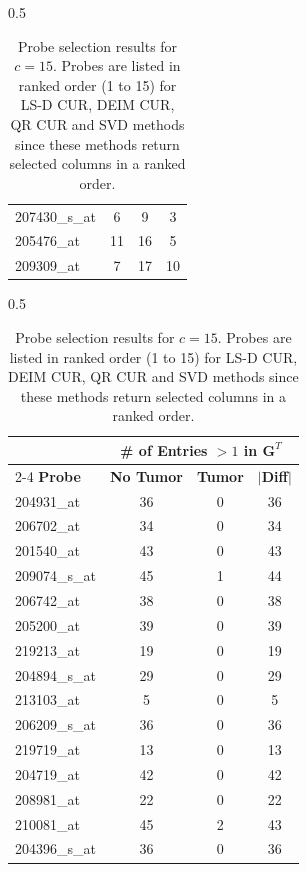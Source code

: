 \documentclass[12pt]{article}
\begin{document}
\begin{table}[H]
\begin{subtable}{0.5\linewidth}
\begin{tabular}{|l|c|c|c|}
        207430\_s\_at & 6 & 9 & 3 \\
        205476\_at & 11 & 16 & 5 \\
        209309\_at & 7 & 17 & 10 \\
        \hline
    \end{tabular}
    \caption{QR CUR.}
    \end{subtable}%
        \begin{subtable}{0.5\linewidth}
    \centering
    \small
    \begin{tabular}{|l|c|c|c|}
        \hline
        & \multicolumn{3}{c|}{\textbf{\# of Entries $>1$ in $\mathbf{G}^T$}} \\ 
        \cline{2-4}
         \textbf{Probe} & \textbf{No Tumor} & \textbf{Tumor} & $|$\textbf{Diff}$|$ \\
        \hline
        204931\_at & 36 & 0 & 36 \\
        206702\_at & 34 & 0 & 34 \\
        201540\_at & 43 & 0 & 43 \\
        209074\_s\_at & 45 & 1 & 44 \\
        206742\_at & 38 & 0 & 38 \\
        205200\_at & 39 & 0 & 39 \\
        219213\_at & 19 & 0 & 19 \\
        204894\_s\_at & 29 & 0 & 29 \\
        213103\_at & 5 & 0 & 5 \\
        206209\_s\_at & 36 & 0 & 36 \\
        219719\_at & 13 & 0 & 13 \\
        204719\_at & 42 & 0 & 42 \\
        208981\_at & 22 & 0 & 22 \\
        210081\_at & 45 & 2 & 43 \\
        204396\_s\_at & 36 & 0 & 36 \\
        \hline
    \end{tabular}
    \caption{SVD.}
    \end{subtable} 
    \caption{Probe selection results for $c=15$. Probes are listed in ranked order (1 to 15) for LS-D CUR, DEIM CUR, QR CUR and SVD methods since these methods return selected columns in a ranked order.}
    \label{tab:ps_15}
\end{table}
\end{document}
